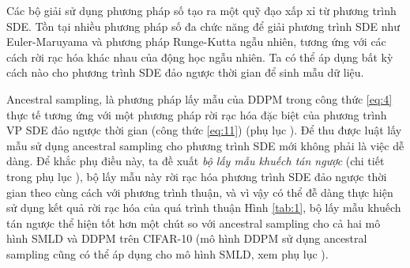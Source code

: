 \documentclass{article} %
\begin{document}
\begin{table}[h!]
    \centering
    \caption{So sánh các bộ giải phương trình SDE đảo ngược thời gian khác nhau trên tập CIFAR-10.
    Vùng tối màu thu được với cùng cách tính toán (số các hàm điểm số).
    Trung bình và độ lệch tiêu chuẩn được đưa ra trên 5 lần chạy.
    "P1000" hoặc "P2000": bộ lấy mẫu mà chỉ dự đoán sử dụng 1000 hoặc 2000 bước.
    "C2000": bộ lấy mẫu chỉ căn chỉnh sử dụng 2000 bước.
    "PC1000": Bộ lấy mẫu dự đoán căn chỉnh sử dụng 1000 bước dự đoán và 1000 bước căn chỉnh.}
    \label{tab:1}
\end{table}

Các bộ giải sử dụng phương pháp số tạo ra một quỹ đạo xấp xỉ từ phương trình SDE.
Tồn tại nhiều phương pháp số đa chức năng để giải phương trình SDE như Euler-Maruyama và phương pháp Runge-Kutta ngẫu nhiên, tương ứng với các cách rời rạc hóa khác nhau của động học ngẫu nhiên.
Ta có thể áp dụng bất kỳ cách nào cho phương trình SDE đảo ngược thời gian để sinh mẫu dữ liệu.

Ancestral sampling, là phương pháp lấy mẫu của DDPM trong công thức \ref{eq:4} thực tế tương ứng với một phương pháp rời rạc hóa đặc biệt của phương trình VP SDE đảo ngược thời gian (công thức \ref{eq:11}) (phụ lục ).
Để thu được luật lấy mẫu sử dụng ancestral sampling cho phương trình SDE mới không phải là việc dễ dàng.
Để khắc phụ điều này, ta đề xuất \textit{bộ lấy mẫu khuếch tán ngược} (chi tiết trong phụ lục ), bộ lấy mẫu này rời rạc hóa phương trình SDE đảo ngược thời gian theo cùng cách với phương trình thuận, và vì vậy có thể đễ dàng thực hiện sử dụng kết quả rời rạc hóa của quá trình thuận
Hình \ref{tab:1}, bộ lấy mẫu khuếch tán ngược thể hiện tốt hơn một chút so với ancestral sampling cho cả hai mô hình SMLD và DDPM trên CIFAR-10 (mô hình DDPM sử dụng ancestral sampling cũng có thể áp dụng cho mô hình SMLD, xem phụ lục ).
\end{document}
